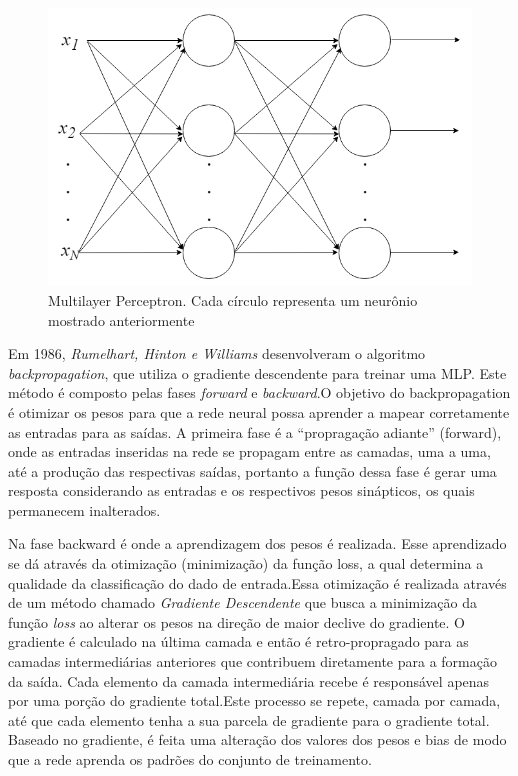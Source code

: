 \begin{figure}[h]
	\centering
	\includegraphics[scale=0.4]{pasta1_figuras/mlp.png}
	\caption{Multilayer Perceptron. Cada círculo representa um neurônio mostrado anteriormente}
	\label{fig-mlp}
\end{figure}

Em 1986, \textit{Rumelhart, Hinton e Williams} \cite{hinton1986} desenvolveram o algoritmo \textit{backpropagation}, que utiliza o gradiente descendente para treinar uma MLP. Este método é composto pelas fases \textit{forward} e \textit{backward}.O objetivo do backpropagation é otimizar os pesos para que a rede neural possa aprender a mapear corretamente as entradas para as saídas. A primeira fase é a ``propragação adiante'' (forward), onde as entradas inseridas na rede se propagam entre as camadas, uma a uma, até a produção das respectivas saídas, portanto a função dessa fase é gerar uma resposta considerando as entradas e os respectivos pesos sinápticos, os quais permanecem inalterados.

Na fase backward é onde a aprendizagem dos pesos é realizada. Esse aprendizado se dá através da otimização (minimização) da função loss, a qual determina a qualidade da classificação do dado de entrada.Essa otimização é realizada através de um método chamado \textit{Gradiente Descendente} que busca a minimização da função \textit{loss} ao alterar os pesos na direção de maior declive do gradiente. O gradiente é calculado na última camada e então é retro-propragado para as camadas intermediárias anteriores que contribuem diretamente para a formação da saída. Cada elemento da camada intermediária recebe é responsável apenas por uma porção do gradiente total.Este processo se repete, camada por camada, até que cada elemento tenha a sua parcela de gradiente para o gradiente total. Baseado no gradiente, é feita uma alteração dos valores dos pesos e bias de modo que a rede aprenda os padrões do conjunto de treinamento.



